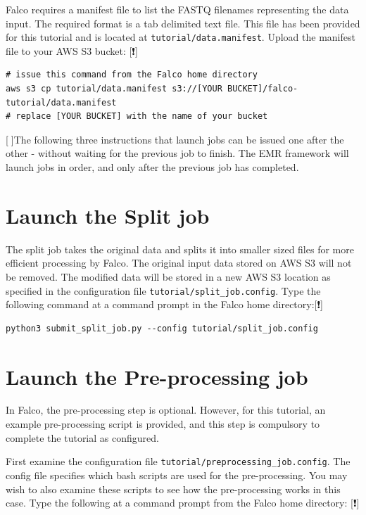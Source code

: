 \documentclass[
]{book}
\begin{document}
Falco requires a manifest file to list the FASTQ filenames representing the data input. The required format is a tab delimited text file. This file has been provided for this tutorial and is located at \texttt{tutorial/data.manifest}. Upload the manifest file to your AWS S3 bucket: {[}❗️{]}

\begin{verbatim}
# issue this command from the Falco home directory
aws s3 cp tutorial/data.manifest s3://[YOUR BUCKET]/falco-tutorial/data.manifest
# replace [YOUR BUCKET] with the name of your bucket
\end{verbatim}

{[}🔴{]}The following three instructions that launch jobs can be issued one after the other - without waiting for the previous job to finish. The EMR framework will launch jobs in order, and only after the previous job has completed.

\hypertarget{launch-the-split-job}{%
\section{Launch the Split job}\label{launch-the-split-job}}

The split job takes the original data and splits it into smaller sized files for more efficient processing by Falco. The original input data stored on AWS S3 will not be removed. The modified data will be stored in a new AWS S3 location as specified in the configuration file \texttt{tutorial/split\_job.config}. Type the following command at a command prompt in the Falco home directory:{[}❗️{]}

\begin{verbatim}
python3 submit_split_job.py --config tutorial/split_job.config
\end{verbatim}

\hypertarget{launch-the-pre-processing-job}{%
\section{Launch the Pre-processing job}\label{launch-the-pre-processing-job}}

In Falco, the pre-processing step is optional. However, for this tutorial, an example pre-processing script is provided, and this step is compulsory to complete the tutorial as configured.

First examine the configuration file \texttt{tutorial/preprocessing\_job.config}. The config file specifies which bash scripts are used for the pre-processing. You may wish to also examine these scripts to see how the pre-processing works in this case. Type the following at a command prompt from the Falco home directory: {[}❗️{]}
\end{document}
